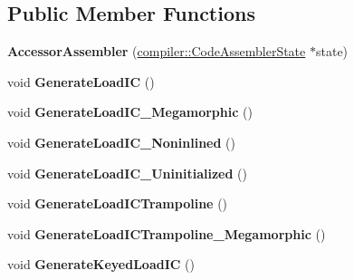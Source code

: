 \subsection*{Public Member Functions}
\begin{DoxyCompactItemize}
\item 
\mbox{\label{classv8_1_1internal_1_1AccessorAssembler_ac5f87c461fb7a2a131e4eea46bbb913f}} 
{\bfseries Accessor\+Assembler} (\mbox{\hyperlink{classv8_1_1internal_1_1compiler_1_1CodeAssemblerState}{compiler\+::\+Code\+Assembler\+State}} $\ast$state)
\item 
\mbox{\label{classv8_1_1internal_1_1AccessorAssembler_a9f57214585c6548e02ee354aa845f5f2}} 
void {\bfseries Generate\+Load\+IC} ()
\item 
\mbox{\label{classv8_1_1internal_1_1AccessorAssembler_a302bbfdb79be8ed012923ebef0e4b61e}} 
void {\bfseries Generate\+Load\+I\+C\+\_\+\+Megamorphic} ()
\item 
\mbox{\label{classv8_1_1internal_1_1AccessorAssembler_afb357a8e65b30c4cba775e1a4555722f}} 
void {\bfseries Generate\+Load\+I\+C\+\_\+\+Noninlined} ()
\item 
\mbox{\label{classv8_1_1internal_1_1AccessorAssembler_a42b6ed81459a839a6c1502b2c97cf635}} 
void {\bfseries Generate\+Load\+I\+C\+\_\+\+Uninitialized} ()
\item 
\mbox{\label{classv8_1_1internal_1_1AccessorAssembler_a973dad3b80ababea0ab25819c421c592}} 
void {\bfseries Generate\+Load\+I\+C\+Trampoline} ()
\item 
\mbox{\label{classv8_1_1internal_1_1AccessorAssembler_a18b651d5375723f1806bfe3e14960d83}} 
void {\bfseries Generate\+Load\+I\+C\+Trampoline\+\_\+\+Megamorphic} ()
\item 
\mbox{\label{classv8_1_1internal_1_1AccessorAssembler_affcf7f5904348ad829ecd19dd3e8ccbc}} 
void {\bfseries Generate\+Keyed\+Load\+IC} ()

\end{DoxyCompactItemize}
